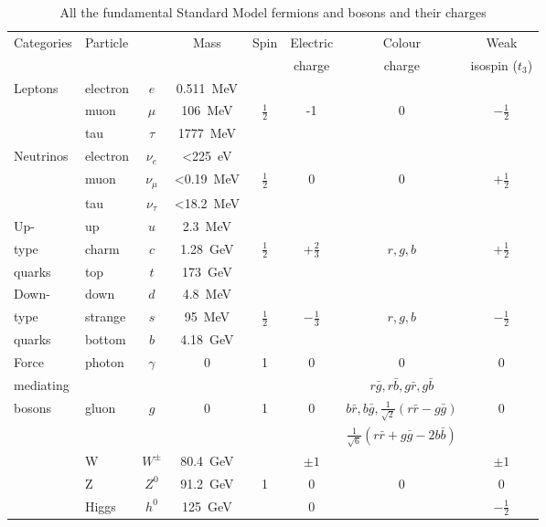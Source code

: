 \begin{table}
\begin{tabular}{l|l c|c|c|c|c|c}
Categories & Particle & & Mass & Spin & Electric & Colour & Weak \\
 &  & & & & charge & charge & isospin ($t_3$)\\
\hline
\hline
Leptons & electron & $e$ & 0.511~MeV & & & & \\
                & muon & $\mu$ & 106~MeV & $\frac{1}{2}$ & -1  & 0 &  $-\frac{1}{2}$\\
                & tau & $\tau$ & 1777~MeV  & &   &  &  \\
\hline
Neutrinos & electron & $\nu_e$ & <225~eV & & & & \\
                & muon & $\nu_{\mu}$ & <0.19~MeV & $\frac{1}{2}$  & 0  & 0 &  $+\frac{1}{2}$\\
                & tau & $\nu_{\tau}$ & <18.2~MeV &  &   &  &  \\
\hline
Up- & up & $u$ & 2.3~MeV & & & \\
type      & charm & $c$ & 1.28~GeV & $\frac{1}{2}$ & $+\frac{2}{3}$  & $r,g,b$ &  $+\frac{1}{2}$\\
quarks          & top & $t$ & 173~GeV  &   &  &  \\
\hline
Down-  & down & $d$ & 4.8~MeV & & & & \\
type & strange & $s$ & 95~MeV & $\frac{1}{2}$ & $-\frac{1}{3}$  & $r,g,b$ &  $-\frac{1}{2}$\\
quarks            & bottom & $b$ & 4.18~GeV &  &   &  &  \\
\hline
Force & photon & $\gamma$ & 0 & 1 & 0 & 0 & 0 \\
\cline{2-8}
 mediating &  &  &  &  &  & $r\bar{g},r\bar{b},g\bar{r},g\bar{b}$\\
 bosons & gluon & $g$ & 0 & 1 & 0 & $b\bar{r},b\bar{g},
\frac{1}{\sqrt{2}}(r\bar{r}-g\bar{g})$ & 0 \\
 & &  &  &  &  & $\frac{1}{\sqrt{6}}(r\bar{r}+g\bar{g}-2b\bar{b})$ &  \\
\cline{2-8}
 & W & $W^{\pm}$ & 80.4~GeV &  & $\pm 1$ &  & $\pm 1$ \\
 & Z & $Z^0$ & 91.2~GeV & 1 & 0 & 0 & 0 \\
 & Higgs & $h^0$ & 125~GeV &  & 0 &  & $-\frac{1}{2}$ \\
\end{tabular}
\caption{All the fundamental Standard Model fermions and bosons and
their charges \cite{PhysRevD.86.010001}}
\label{tab:smParticles}
\end{table}

